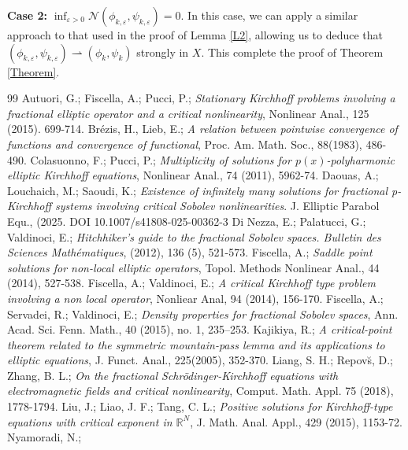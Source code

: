 \documentclass[10pt,a4paper]{amsart}
\numberwithin{equation}{section}
\begin{document}
\noindent\textbf{Case 2:} 
$\inf_{\varepsilon>0} \mathcal{N}(\phi_{k,\varepsilon},\psi_{k,\varepsilon})=0$. 
In this case, we can apply a similar approach to that used in the proof of 
Lemma \ref{L2}, allowing us to deduce that 
$(\phi_{k,\varepsilon},\psi_{k,\varepsilon})\rightharpoonup (\phi_k,\psi_k)$ 
strongly in $X$. This complete the proof of Theorem \ref{Theorem}.

\begin{thebibliography}{99}
 Autuori, G.;  Fiscella, A.;  Pucci, P.;
\emph{Stationary  Kirchhoff  problems  involving  a  fractional  elliptic operator 
and a critical nonlinearity}, Nonlinear Anal., 125 (2015). 699-714.
 Br\'ezis, H., Lieb, E.;
\emph{A relation between pointwise convergence of functions and convergence of 
functional}, Proc. Am. Math. Soc., 88(1983), 486-490.
 Colasuonno, F.; Pucci, P.;
\emph{Multiplicity of solutions for $p(x)$-polyharmonic elliptic Kirchhoff equations}, 
Nonlinear Anal.,  74 (2011), 5962-74.
 Daouas, A.; Louchaich, M.; Saoudi, K.;
\emph{Existence of infinitely many solutions for fractional p-Kirchhoff systems 
involving critical Sobolev nonlinearities}. J. Elliptic Parabol Equ.,
 (2025. DOI 10.1007/s41808-025-00362-3
 Di Nezza, E.; Palatucci, G.; Valdinoci, E.;
\emph{Hitchhiker's guide to the fractional Sobolev spaces. Bulletin des Sciences 
Math\'ematiques}, (2012), 136 (5), 521-573.
 Fiscella, A.;
\emph{Saddle  point  solutions  for  non-local  elliptic  operators},  
Topol. Methods Nonlinear Anal., 44 (2014), 527-538.
 Fiscella, A.;  Valdinoci, E.;
\emph{A critical Kirchhoff type problem involving a non local operator}, 
Nonliear Anal, 94 (2014), 156-170.
 Fiscella, A.; Servadei, R.; Valdinoci, E.;
\emph{Density properties for fractional Sobolev spaces}, 
Ann. Acad. Sci. Fenn. Math., 40 (2015), no. 1, 235–253.
 Kajikiya, R.;
\emph{A critical-point theorem related to the symmetric mountain-pass lemma and its
 applications to elliptic equations}, J. Funct. Anal., 225(2005), 352-370.
 Liang, S. H.; Repov\u s, D.; Zhang, B. L.;
\emph{On the fractional Schr\"odinger-Kirchhoff equations with electromagnetic 
fields and critical nonlinearity}, Comput. Math. Appl. 75 (2018), 1778-1794.
 Liu, J.;  Liao, J. F.;  Tang, C. L.;
 \emph{Positive  solutions  for  Kirchhoff-type  equations  with  critical  
 exponent in $\mathbb{R}^N$}, J. Math. Anal. Appl., 429 (2015), 1153-72.
 Nyamoradi, N.;

\end{thebibliography}
\end{document}
